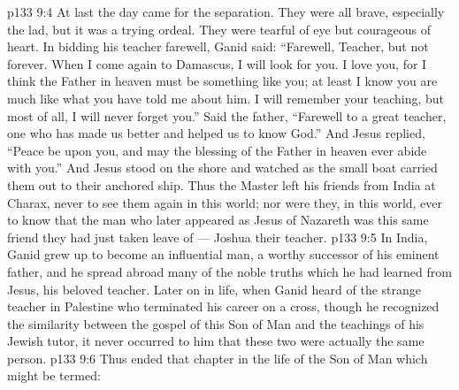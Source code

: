 \vs p133 9:4 \pc At last the day came for the separation. They were all brave, especially the lad, but it was a trying ordeal. They were tearful of eye but courageous of heart. In bidding his teacher farewell, Ganid said: “Farewell, Teacher, but not forever. When I come again to Damascus, I will look for you. I love you, for I think the Father in heaven must be something like you; at least I know you are much like what you have told me about him. I will remember your teaching, but most of all, I will never forget you.” Said the father, “Farewell to a great teacher, one who has made us better and helped us to know God.” And Jesus replied, \textcolor{ubdarkred}{“Peace be upon you, and may the blessing of the Father in heaven ever abide with you.”} And Jesus stood on the shore and watched as the small boat carried them out to their anchored ship. Thus the Master left his friends from India at Charax, never to see them again in this world; nor were they, in this world, ever to know that the man who later appeared as Jesus of Nazareth was this same friend they had just taken leave of --- Joshua their teacher.
\vs p133 9:5 In India, Ganid grew up to become an influential man, a worthy successor of his eminent father, and he spread abroad many of the noble truths which he had learned from Jesus, his beloved teacher. Later on in life, when Ganid heard of the strange teacher in Palestine who terminated his career on a cross, though he recognized the similarity between the gospel of this Son of Man and the teachings of his Jewish tutor, it never occurred to him that these two were actually the same person.
\vs p133 9:6 \pc Thus ended that chapter in the life of the Son of Man which might be termed: 
